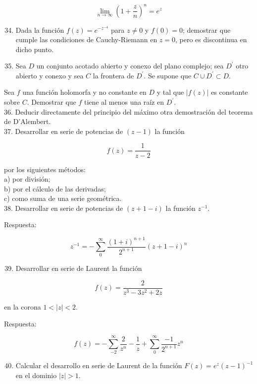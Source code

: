 \documentclass[10pt]{article}
\theoremstyle{plain}
\theoremstyle{definition}
\theoremstyle{remark}
\begin{document}
$$
\lim _{n \rightarrow \infty}\left(1+\frac{z}{n}\right)^{n}=e^{z}
$$

\begin{enumerate}
  \setcounter{enumi}{33}
  \item Dada la función $f(z)=e^{-z^{-4}}$ para $z \neq 0$ y $f(0)=0$; demostrar que cumple las condiciones de Cauchy-Riemann en $z=0$, pero es discontinua en dicho punto.
  \item Sea $D$ un conjunto acotado abierto y conexo del plano complejo; sea $D^{\prime}$ otro abierto y conexo y sea $C$ la frontera de $D^{\prime}$. Se supone que $C \cup D^{\prime} \subset D$.
\end{enumerate}

Sea $f$ una función holomorfa y no constante en $D$ y tal que $|f(z)|$ es constante sobre $C$. Demostrar que $f$ tiene al menos una raíz en $D^{\prime}$.\\
36. Deducir directamente del principio del máximo otra demostración del teorema de D'Alembert.\\
37. Desarrollar en serie de potencias de $(z-1)$ la función

$$
f(z)=\frac{1}{z-2}
$$

por los siguientes métodos:\\
a) por división;\\
b) por el cálculo de las derivadas;\\
c) como suma de una serie geométrica.\\
38. Desarrollar en serie de potencias de $(z+1-i)$ la función $z^{-1}$.

Respuesta:

$$
z^{-1}=-\sum_{0}^{\infty} \frac{(1+i)^{n+1}}{2^{n+1}}(z+1-i)^{n}
$$

\begin{enumerate}
  \setcounter{enumi}{38}
  \item Desarrollar en serie de Laurent la función
\end{enumerate}

$$
f(z)=\frac{2}{z^{3}-3 z^{2}+2 z}
$$

en la corona $1<|z|<2$.

Respuesta:

$$
f(z)=-\sum_{-2}^{\infty} \frac{2}{z^{n}}-\frac{1}{z}+\sum_{0}^{\infty} \frac{-1}{2^{n+1}} z^{n}
$$

\begin{enumerate}
  \setcounter{enumi}{39}
  \item Calcular el desarrollo en serie de Laurent de la función $F(z)=e^{z}(z-1)^{-1}$ en el dominio $|z|>1$.
\end{enumerate}
\end{document}

